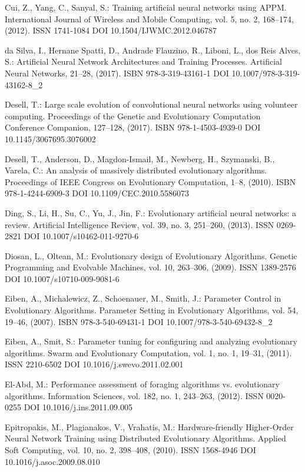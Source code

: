\begin{thebibliography}{99.}
 Cui, Z., Yang, C., Sanyal, S.: Training artificial neural networks using APPM. International Journal of Wireless and Mobile Computing, vol. 5, no. 2, 168--174, (2012). ISSN 1741-1084 DOI 10.1504/IJWMC.2012.046787

 da Silva, I., Hernane Spatti, D., Andrade Flauzino, R., Liboni, L., dos Reis Alves, S.: Artificial Neural Network Architectures and Training Processes. Artificial Neural Networks, 21--28, (2017). ISBN 978-3-319-43161-1 DOI 10.1007/978-3-319-43162-8\_2

 Desell, T.: Large scale evolution of convolutional neural networks using volunteer computing. Proceedings of the Genetic and Evolutionary Computation Conference Companion, 127--128, (2017). ISBN 978-1-4503-4939-0 DOI 10.1145/3067695.3076002

 Desell, T., Anderson, D., Magdon-Ismail, M., Newberg, H., Szymanski, B., Varela, C.: An analysis of massively distributed evolutionary algorithms. Proceedings of IEEE Congress on Evolutionary Computation, 1--8, (2010). ISBN 978-1-4244-6909-3 DOI 10.1109/CEC.2010.5586073

 Ding, S., Li, H., Su, C., Yu, J., Jin, F.: Evolutionary artificial neural networks: a review. Artificial Intelligence Review, vol. 39, no. 3, 251--260, (2013). ISSN 0269-2821 DOI 10.1007/s10462-011-9270-6

 Diosan, L., Oltean, M.: Evolutionary design of Evolutionary Algorithms. Genetic Programming and Evolvable Machines, vol. 10, 263--306, (2009). ISSN 1389-2576 DOI 10.1007/s10710-009-9081-6

 Eiben, A., Michalewicz, Z., Schoenauer, M., Smith, J.: Parameter Control in Evolutionary Algorithms. Parameter Setting in Evolutionary Algorithms, vol. 54, 19--46, (2007). ISBN 978-3-540-69431-1 DOI 10.1007/978-3-540-69432-8\_2

 Eiben, A., Smit, S.: Parameter tuning for configuring and analyzing evolutionary algorithms. Swarm and Evolutionary Computation, vol. 1, no. 1, 19--31, (2011). ISSN 2210-6502 DOI 10.1016/j.swevo.2011.02.001

 El-Abd, M.: Performance assessment of foraging algorithms vs. evolutionary algorithms. Information Sciences, vol. 182, no. 1, 243--263, (2012). ISSN 0020-0255 DOI 10.1016/j.ins.2011.09.005

 Epitropakis, M., Plagianakos, V., Vrahatis, M.: Hardware-friendly Higher-Order Neural Network Training using Distributed Evolutionary Algorithms. Applied Soft Computing, vol. 10, no. 2, 398--408, (2010). ISSN 1568-4946 DOI 10.1016/j.asoc.2009.08.010


\end{thebibliography}
